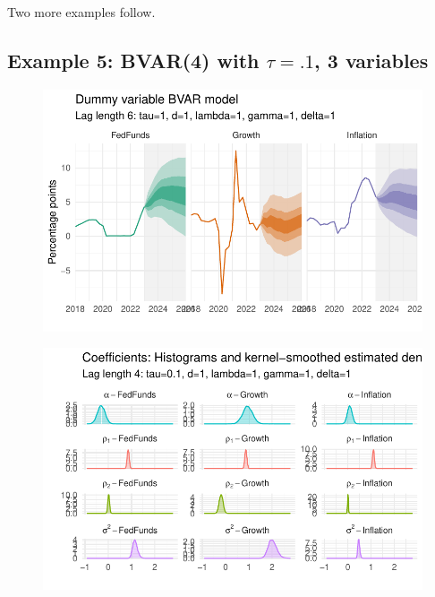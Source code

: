 \documentclass[
  letterpaper,
]{book}
\begin{document}
Two more examples follow.

\hypertarget{example-5-bvar4-with-tau.1-3-variables}{%
\subsection{\texorpdfstring{Example 5: BVAR(4) with \(\tau=.1\), 3
variables}{Example 5: BVAR(4) with \textbackslash tau=.1, 3 variables}}\label{example-5-bvar4-with-tau.1-3-variables}}

\begin{figure}

{\centering \includegraphics{BVAR_files/figure-pdf/estim-1.pdf}

}

\end{figure}

\begin{figure}

{\centering \includegraphics{BVAR_files/figure-pdf/unnamed-chunk-12-1.pdf}

}

\end{figure}
\end{document}

